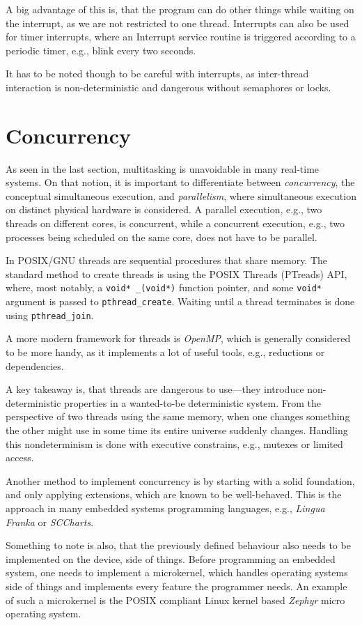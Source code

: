 A big advantage of this is, that the program can do other things while waiting on the interrupt, as we are not restricted to one thread.
Interrupts can also be used for timer interrupts, where an Interrupt service routine is triggered according to a periodic timer, e.g., blink every two seconds.

It has to be noted though to be careful with interrupts, as inter-thread interaction is non-deterministic and dangerous without semaphores or locks.

\section{Concurrency}
As seen in the last section, multitasking is unavoidable in many real-time systems.
On that notion, it is important to differentiate between \emph{concurrency}, the conceptual simultaneous execution, and \emph{parallelism}, where simultaneous execution on distinct physical hardware is considered.
A parallel execution, e.g., two threads on different cores, is concurrent, while a concurrent execution, e.g., two processes being scheduled on the same core, does not have to be parallel.

In POSIX/GNU threads are sequential procedures that share memory.
The standard method to create threads is using the POSIX Threads (PTreads) API, where, most notably, a \lstinline|void* _(void*)| function pointer, and some \lstinline|void*| argument is passed to \lstinline|pthread_create|.
Waiting until a thread terminates is done using \lstinline|pthread_join|.

A more modern framework for threads is \emph{OpenMP}, which is generally considered to be more handy, as it implements a lot of useful tools, e.g., reductions or dependencies.

A key takeaway is, that threads are dangerous to use---they introduce non-deterministic properties in a wanted-to-be deterministic system.
From the perspective of two threads using the same memory, when one changes something the other might use in some time its entire universe suddenly changes.
Handling this nondeterminism is done with executive constrains, e.g., mutexes or limited access.

Another method to implement concurrency is by starting with a solid foundation, and only applying extensions, which are known to be well-behaved.
This is the approach in many embedded systems programming languages, e.g., \emph{Lingua Franka} or \emph{SCCharts}.

Something to note is also, that the previously defined behaviour also needs to be implemented on the device, side of things.
Before programming an embedded system, one needs to implement a microkernel, which handles operating systems side of things and implements every feature the programmer needs.
An example of such a microkernel is the POSIX compliant Linux kernel based \emph{Zephyr} micro operating system.

